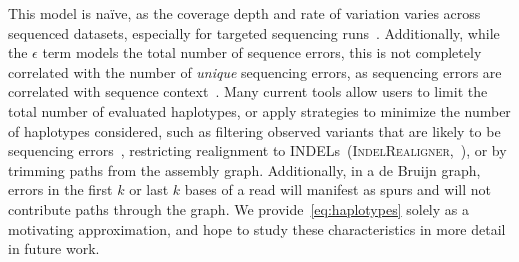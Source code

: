 \documentclass{bioinfo}
\begin{document}
This model is na\"{i}ve, as the coverage depth and rate of variation varies across sequenced datasets,
especially for targeted sequencing runs~\citep{fang14}. Additionally, while the $\epsilon$ term models the
total number of sequence errors, this is not completely correlated with the number of \emph{unique}
sequencing errors, as sequencing errors are correlated with sequence context~\citep{depristo11}. Many
current tools allow users to limit the total number of evaluated haplotypes, or apply strategies to minimize
the number of haplotypes considered, such as filtering observed variants that are likely to be sequencing
errors~\citep{garrison12}, restricting realignment to INDELs~(\textsc{IndelRealigner},~\citet{depristo11}), or
by trimming paths from the assembly graph. Additionally, in a de Bruijn graph, errors in the
first $k$ or last $k$ bases of a read will manifest as spurs and will not contribute paths through the graph. We provide~\eqref{eq:haplotypes} solely as a motivating
approximation, and hope to study these characteristics in more detail in future work.
\end{document}
